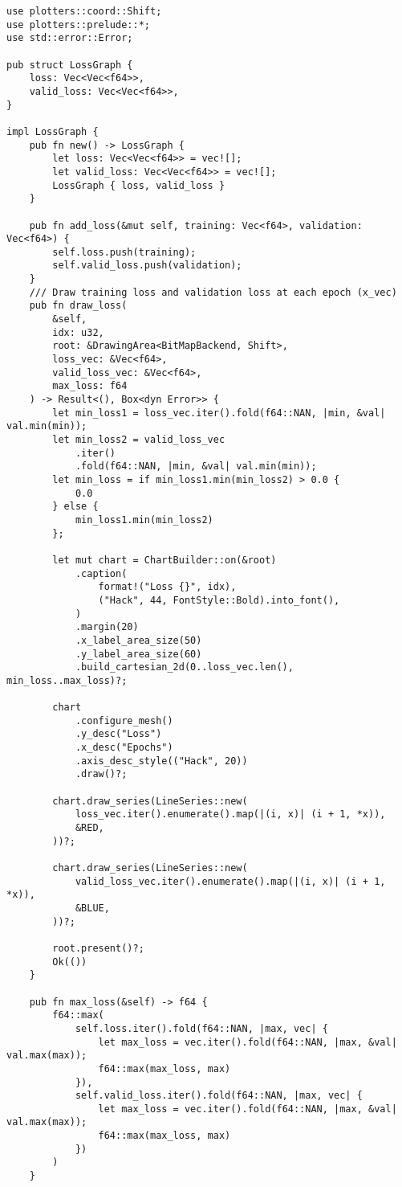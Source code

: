 \begin{verbatim}      
use plotters::coord::Shift;
use plotters::prelude::*;
use std::error::Error;

pub struct LossGraph {
    loss: Vec<Vec<f64>>,
    valid_loss: Vec<Vec<f64>>,
}

impl LossGraph {
    pub fn new() -> LossGraph {
        let loss: Vec<Vec<f64>> = vec![];
        let valid_loss: Vec<Vec<f64>> = vec![];
        LossGraph { loss, valid_loss }
    }

    pub fn add_loss(&mut self, training: Vec<f64>, validation: Vec<f64>) {
        self.loss.push(training);
        self.valid_loss.push(validation);
    }
    /// Draw training loss and validation loss at each epoch (x_vec)
    pub fn draw_loss(
        &self,
        idx: u32,
        root: &DrawingArea<BitMapBackend, Shift>,
        loss_vec: &Vec<f64>,
        valid_loss_vec: &Vec<f64>,
        max_loss: f64
    ) -> Result<(), Box<dyn Error>> {
        let min_loss1 = loss_vec.iter().fold(f64::NAN, |min, &val| val.min(min));
        let min_loss2 = valid_loss_vec
            .iter()
            .fold(f64::NAN, |min, &val| val.min(min));
        let min_loss = if min_loss1.min(min_loss2) > 0.0 {
            0.0
        } else {
            min_loss1.min(min_loss2)
        };

        let mut chart = ChartBuilder::on(&root)
            .caption(
                format!("Loss {}", idx),
                ("Hack", 44, FontStyle::Bold).into_font(),
            )
            .margin(20)
            .x_label_area_size(50)
            .y_label_area_size(60)
            .build_cartesian_2d(0..loss_vec.len(), min_loss..max_loss)?;

        chart
            .configure_mesh()
            .y_desc("Loss")
            .x_desc("Epochs")
            .axis_desc_style(("Hack", 20))
            .draw()?;

        chart.draw_series(LineSeries::new(
            loss_vec.iter().enumerate().map(|(i, x)| (i + 1, *x)),
            &RED,
        ))?;

        chart.draw_series(LineSeries::new(
            valid_loss_vec.iter().enumerate().map(|(i, x)| (i + 1, *x)),
            &BLUE,
        ))?;

        root.present()?;
        Ok(())
    }

    pub fn max_loss(&self) -> f64 {
        f64::max(
            self.loss.iter().fold(f64::NAN, |max, vec| {
                let max_loss = vec.iter().fold(f64::NAN, |max, &val| val.max(max));
                f64::max(max_loss, max)
            }),
            self.valid_loss.iter().fold(f64::NAN, |max, vec| {
                let max_loss = vec.iter().fold(f64::NAN, |max, &val| val.max(max));
                f64::max(max_loss, max)
            })
        )
    }


\end{verbatim}
